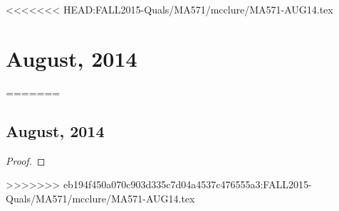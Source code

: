 <<<<<<< HEAD:FALL2015-Quals/MA571/mcclure/MA571-AUG14.tex
\chapter{August, 2014}

=======
\section{August, 2014}
\begin{problem}
\textzh{}
\end{problem}
\begin{proof}
\end{proof}
>>>>>>> eb194f450a070c903d335c7d04a4537c476555a3:FALL2015-Quals/MA571/mcclure/MA571-AUG14.tex

